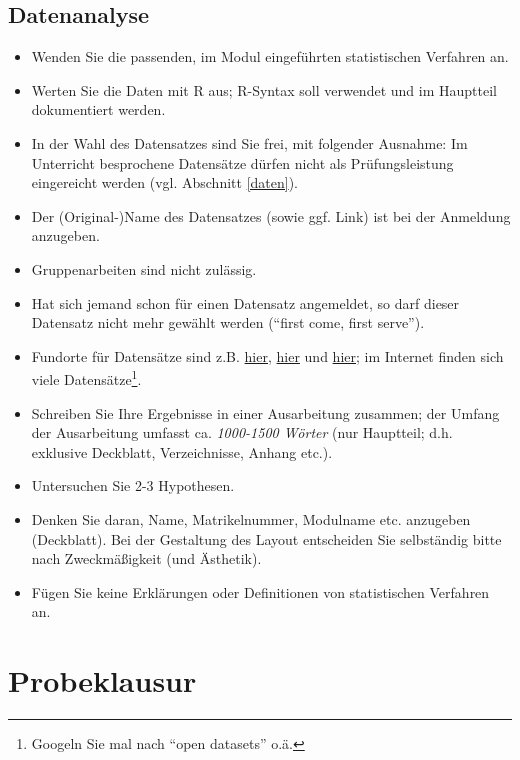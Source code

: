 \documentclass[12pt,ngerman,]{book}
\let\rmarkdownfootnote\footnote%
\def\footnote{\protect\rmarkdownfootnote}
\begin{document}
\section{Datenanalyse}\label{datenanalyse-1}

\begin{itemize}
\item
  Wenden Sie die passenden, im Modul eingeführten statistischen
  Verfahren an.
\item
  Werten Sie die Daten mit R aus; R-Syntax soll verwendet und im
  Hauptteil dokumentiert werden.
\item
  In der Wahl des Datensatzes sind Sie frei, mit folgender Ausnahme: Im
  Unterricht besprochene Datensätze dürfen nicht als Prüfungsleistung
  eingereicht werden (vgl. Abschnitt \ref{daten}).
\item
  Der (Original-)Name des Datensatzes (sowie ggf. Link) ist bei der
  Anmeldung anzugeben.
\item
  Gruppenarbeiten sind nicht zulässig.
\item
  Hat sich jemand schon für einen Datensatz angemeldet, so darf dieser
  Datensatz nicht mehr gewählt werden (``first come, first serve'').
\item
  Fundorte für Datensätze sind z.B.
  \href{http://www.stat.ufl.edu/~winner/datasets.html}{hier},
  \href{http://archive.ics.uci.edu/ml/datasets.html}{hier} und
  \href{http://vincentarelbundock.github.io/Rdatasets/datasets.html}{hier};
  im Internet finden sich viele Datensätze\footnote{Googeln Sie mal nach
    ``open datasets'' o.ä.}.
\item
  Schreiben Sie Ihre Ergebnisse in einer Ausarbeitung zusammen; der
  Umfang der Ausarbeitung umfasst ca. \emph{1000-1500 Wörter} (nur
  Hauptteil; d.h. exklusive Deckblatt, Verzeichnisse, Anhang etc.).
\item
  Untersuchen Sie 2-3 Hypothesen.
\item
  Denken Sie daran, Name, Matrikelnummer, Modulname etc. anzugeben
  (Deckblatt). Bei der Gestaltung des Layout entscheiden Sie selbständig
  bitte nach Zweckmäßigkeit (und Ästhetik).
\item
  Fügen Sie keine Erklärungen oder Definitionen von statistischen
  Verfahren an.
\end{itemize}

\chapter{Probeklausur}\label{probeklausur}
\end{document}
